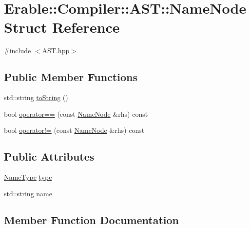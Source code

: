 \hypertarget{struct_erable_1_1_compiler_1_1_a_s_t_1_1_name_node}{}\section{Erable\+::Compiler\+::A\+ST\+::Name\+Node Struct Reference}
\label{struct_erable_1_1_compiler_1_1_a_s_t_1_1_name_node}


{\ttfamily \#include $<$A\+S\+T.\+hpp$>$}

\subsection*{Public Member Functions}
\begin{DoxyCompactItemize}
\item 
std\+::string \mbox{\hyperlink{struct_erable_1_1_compiler_1_1_a_s_t_1_1_name_node_acc5b111aaee85751704e583fb9c57e92}{to\+String}} ()
\item 
bool \mbox{\hyperlink{struct_erable_1_1_compiler_1_1_a_s_t_1_1_name_node_a31f385a6b5c3b57e3bdaf4e15dbd4c09}{operator==}} (const \mbox{\hyperlink{struct_erable_1_1_compiler_1_1_a_s_t_1_1_name_node}{Name\+Node}} \&rhs) const
\item 
bool \mbox{\hyperlink{struct_erable_1_1_compiler_1_1_a_s_t_1_1_name_node_a8f01ecf31fe8e2ccdd6824bc394d145e}{operator!=}} (const \mbox{\hyperlink{struct_erable_1_1_compiler_1_1_a_s_t_1_1_name_node}{Name\+Node}} \&rhs) const
\end{DoxyCompactItemize}
\subsection*{Public Attributes}
\begin{DoxyCompactItemize}
\item 
\mbox{\hyperlink{namespace_erable_1_1_compiler_1_1_a_s_t_a9359137137aacfee07e935a0ae706a84}{Name\+Type}} \mbox{\hyperlink{struct_erable_1_1_compiler_1_1_a_s_t_1_1_name_node_a63676b5da4555fa31cb7448ef3512d84}{type}}
\item 
std\+::string \mbox{\hyperlink{struct_erable_1_1_compiler_1_1_a_s_t_1_1_name_node_a11152e1bde7049caa9f7036016ad3098}{name}}
\end{DoxyCompactItemize}


\subsection{Member Function Documentation}
\mbox{\label{struct_erable_1_1_compiler_1_1_a_s_t_1_1_name_node_a8f01ecf31fe8e2ccdd6824bc394d145e}} 
